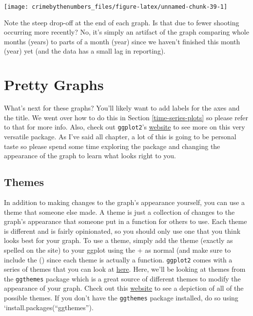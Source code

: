 \documentclass[
  12pt,
]{book}
\begin{document}
\begin{center}\texttt{[image: crimebythenumbers\_files/figure-latex/unnamed-chunk-39-1]} \end{center}

Note the steep drop-off at the end of each graph. Is that due to fewer shooting occurring more recently? No, it's simply an artifact of the graph comparing whole months (years) to parts of a month (year) since we haven't finished this month (year) yet (and the data has a small lag in reporting).

\hypertarget{pretty-graphs}{%
\section{Pretty Graphs}\label{pretty-graphs}}

What's next for these graphs? You'll likely want to add labels for the axes and the title. We went over how to do this in Section \ref{time-series-plots} so please refer to that for more info. Also, check out \texttt{ggplot2}'s \href{https://ggplot2.tidyverse.org/reference/index.html\#section-scales}{website} to see more on this very versatile package. As I've said all chapter, a lot of this is going to be personal taste so please spend some time exploring the package and changing the appearance of the graph to learn what looks right to you.

\hypertarget{themes}{%
\subsection{Themes}\label{themes}}

In addition to making changes to the graph's appearance yourself, you can use a theme that someone else made. A theme is just a collection of changes to the graph's appearance that someone put in a function for others to use. Each theme is different and is fairly opinionated, so you should only use one that you think looks best for your graph. To use a theme, simply add the theme (exactly as spelled on the site) to your ggplot using the + as normal (and make sure to include the () since each theme is actually a function. \texttt{ggplot2} comes with a series of themes that you can look at \href{https://ggplot2.tidyverse.org/reference/ggtheme.html}{here}. Here, we'll be looking at themes from the \texttt{ggthemes} package which is a great source of different themes to modify the appearance of your graph. Check out this \href{https://yutannihilation.github.io/allYourFigureAreBelongToUs/ggthemes/}{website} to see a depiction of all of the possible themes. If you don't have the \texttt{ggthemes} package installed, do so using `install.packages(``ggthemes'').
\end{document}

